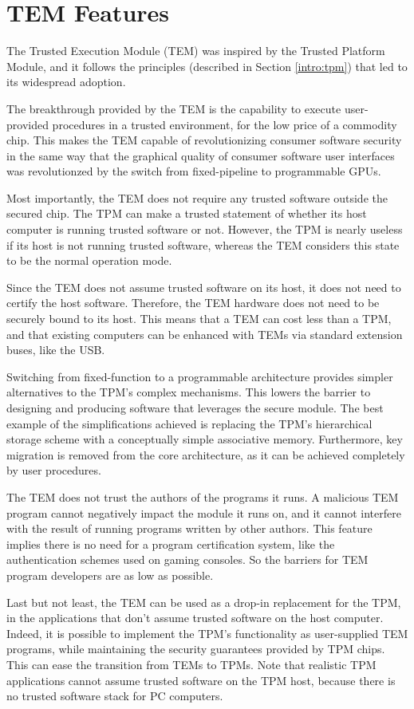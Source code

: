 \section{TEM Features}\label{intro:features}
The Trusted Execution Module (TEM) was inspired by the Trusted Platform Module,
and it follows the principles (described in Section \ref{intro:tpm}) that led to
its widespread adoption.

The breakthrough provided by the TEM is the capability to execute user-provided
procedures in a trusted environment, for the low price of a commodity chip.
This makes the TEM capable of revolutionizing consumer software security in
the same way that the graphical quality of consumer software user interfaces
was revolutionzed by the switch from fixed-pipeline to programmable GPUs.

Most importantly, the TEM does not require any trusted software outside the
secured chip. The TPM can make a trusted statement of whether its host computer
is running trusted software or not. However, the TPM is nearly useless if its
host is not running trusted software, whereas the TEM considers this state to
be the normal operation mode.

Since the TEM does not assume trusted software on its host, it does not need to
certify the host software. Therefore, the TEM hardware does not need to be
securely bound to its host. This means that a TEM can cost less than a TPM, and
that existing computers can be enhanced with TEMs via standard extension
buses, like the USB.

Switching from fixed-function to a programmable architecture provides simpler
alternatives to the TPM's complex mechanisms. This lowers the barrier to
designing and producing software that leverages the secure module. The best
example of the simplifications achieved is replacing the TPM's hierarchical
storage scheme with a conceptually simple associative memory. Furthermore, key
migration is removed from the core architecture, as it can be achieved
completely by user procedures.

The TEM does not trust the authors of the programs it runs. A malicious
TEM program cannot negatively impact the module it runs on, and it cannot
interfere with the result of running programs written by other authors. This
feature implies there is no need for a program certification system, like
the authentication schemes used on gaming consoles. So the barriers for TEM
program developers are as low as possible.

Last but not least, the TEM can be used as a drop-in replacement for the TPM,
in the applications that don't assume trusted software on the host computer.
Indeed, it is possible to implement the TPM's functionality as user-supplied TEM
programs, while maintaining the security guarantees provided by TPM chips. This
can ease the transition from TEMs to TPMs. Note that realistic TPM applications
cannot assume trusted software on the TPM host, because there is no trusted
software stack for PC computers.
